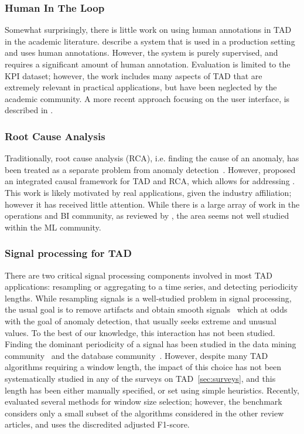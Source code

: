 \subsubsection{Human In The Loop}
Somewhat surprisingly, there is little work on using human annotations in TAD in the academic literature. \citet{liu2015opprentice} describe a system that is used in a production setting and uses human annotations. However, the system is purely supervised, and requires a significant amount of human annotation. Evaluation is limited to the KPI dataset; however, the work includes many aspects of TAD that are extremely relevant in practical applications, but have been neglected by the academic community. A more recent approach focusing on the user interface, is described in \citet{deng2024reliable}.

\subsubsection{Root Cause Analysis}
Traditionally, root cause analysis (RCA), i.e. finding the cause of an anomaly, has been treated as a separate problem from anomaly detection~\citep{soldani2022anomaly}. However, \citet{yang2022causal} proposed an integrated causal framework for TAD and RCA, which allows for addressing \conditionalanomalies. This work is likely motivated by real applications, given the industry affiliation; however it has received little attention. While there is a large array of work in the operations and BI community, as reviewed by \citet{soldani2022anomaly}, the area seems not well studied within the ML community.


\subsubsection{Signal processing for TAD}
There are two critical signal processing components involved in most TAD applications: resampling or aggregating to a time series, and detecting periodicity lengths. While resampling signals is a well-studied problem in signal processing, the usual goal is to remove artifacts and obtain smooth signals~\citep{oppenheim1999discrete} which at odds with the goal of anomaly detection, that usually seeks extreme and unusual values. To the best of our knowledge, this interaction has not been studied.
Finding the dominant periodicity of a signal has been studied in the data mining community~\citep{vlachos2005periodicity} and the database community~\citep{elfeky2005periodicity, wen2021robustperiod}.
However, despite many TAD algorithms requiring a window length, the impact of this choice has not been systematically studied in any of the surveys on TAD~\ref{sec:surveys}, and this length has been either manually specified, or set using simple heuristics. Recently, \cite{ermshaus2023window} evaluated several methods for window size selection; however, the benchmark considers only a small subset of the algorithms considered in the other review articles, and uses the discredited adjusted F1-score.